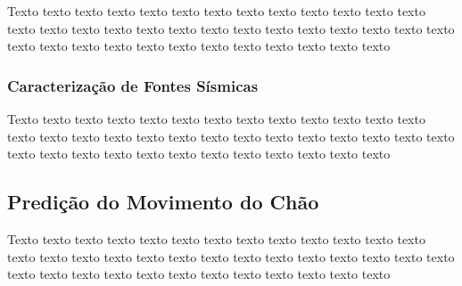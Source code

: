 Texto texto texto texto texto texto texto texto texto texto texto texto texto
texto texto texto texto texto texto texto texto texto texto texto texto texto
texto texto texto texto texto texto texto texto texto texto texto texto texto



\subsubsection{Caracterização de Fontes Sísmicas}
\label{sec:fontes}



Texto texto texto texto texto texto texto texto texto texto texto texto texto
texto texto texto texto texto texto texto texto texto texto texto texto texto
texto texto texto texto texto texto texto texto texto texto texto texto texto





\subsection{Predição do Movimento do Chão} 
\label{sec:gmpe}


Texto texto texto texto texto texto texto texto texto texto texto texto texto
texto texto texto texto texto texto texto texto texto texto texto texto texto
texto texto texto texto texto texto texto texto texto texto texto texto texto

